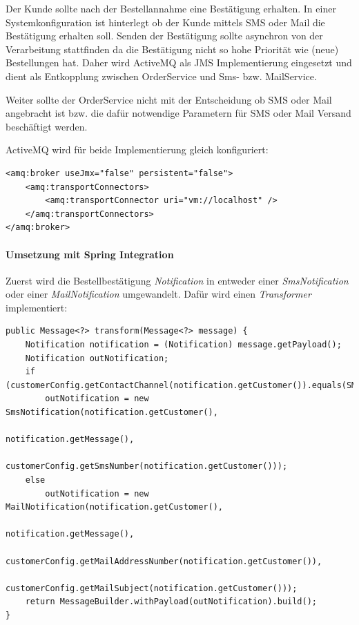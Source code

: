 \documentclass[12pt,a4paper,ngerman]{article}
\begin{document}
Der Kunde sollte nach der Bestellannahme eine Bestätigung erhalten. In
einer Systemkonfiguration ist hinterlegt ob der Kunde mittels SMS oder
Mail die Bestätigung erhalten soll. Senden der Bestätigung sollte
asynchron von der Verarbeitung stattfinden da die Bestätigung nicht so
hohe Priorität wie (neue) Bestellungen hat. Daher wird ActiveMQ als JMS
Implementierung eingesetzt und dient als Entkopplung zwischen
OrderService und Sms- bzw. MailService.

Weiter sollte der OrderService nicht mit der Entscheidung ob SMS oder
Mail angebracht ist bzw. die dafür notwendige Parametern für SMS oder
Mail Versand beschäftigt werden.

ActiveMQ wird für beide Implementierung gleich konfiguriert:

\begin{lstlisting}
<amq:broker useJmx="false" persistent="false">
    <amq:transportConnectors>
        <amq:transportConnector uri="vm://localhost" />
    </amq:transportConnectors>
</amq:broker>
\end{lstlisting}

\paragraph{Umsetzung mit Spring Integration}

Zuerst wird die Bestellbestätigung \emph{Notification} in entweder einer
\emph{SmsNotification} oder einer \emph{MailNotification} umgewandelt.
Dafür wird einen \emph{Transformer} implementiert:

\begin{lstlisting}
public Message<?> transform(Message<?> message) {
    Notification notification = (Notification) message.getPayload();
    Notification outNotification;
    if (customerConfig.getContactChannel(notification.getCustomer()).equals(SMS))
        outNotification = new SmsNotification(notification.getCustomer(),
                                              notification.getMessage(), 
                                              customerConfig.getSmsNumber(notification.getCustomer()));
    else
        outNotification = new MailNotification(notification.getCustomer(),
                                               notification.getMessage(), 
                                               customerConfig.getMailAddressNumber(notification.getCustomer()),
                                               customerConfig.getMailSubject(notification.getCustomer()));
    return MessageBuilder.withPayload(outNotification).build();
}
\end{lstlisting}
\end{document}
